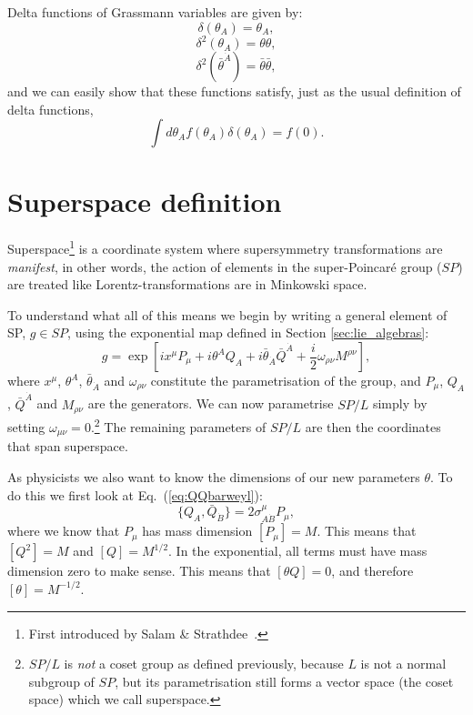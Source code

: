 \documentclass[notes.tex]{subfiles}
\begin{document}
Delta functions of Grassmann variables are given by:
\[\delta(\theta_A) = \theta_A,\]
\[\delta^2(\theta_A) = \theta\theta,\]
\[\delta^2(\bar{\theta}^{\dot{A}}) = \bar{\theta}\bar{\theta},\]
and we can easily show that these functions satisfy, just as the usual definition of delta functions,
\[\int d\theta_A f(\theta_A)\delta(\theta_A) = f(0).\]


\section[Superspace definition]{Superspace definition}
\label{sec:superspace}
Superspace\footnote{First introduced by Salam \& Strathdee~\cite{Salam:1974jj}.} is a coordinate system where supersymmetry transformations are {\it manifest}, in other words, the action of elements in the super-Poincaré group ($SP$) are treated like Lorentz-transformations are in Minkowski space.

To understand what all of this means we begin by writing a general element of SP, $g\in SP$, using the exponential map defined in Section \ref{sec:lie_algebras}:
\[g = \exp[ix^\mu P_\mu + i\theta^{A} Q_A + i\bar{\theta}_{\dot{A}}\bar{Q}^{\dot{A}} + \frac{i}{2}\omega_{\rho\nu}M^{\rho\nu}],\]
where $x^\mu$, $\theta^{A}$, $\bar{\theta}_{\dot{A}}$ and $\omega_{\rho\nu}$ constitute the parametrisation of the group, and $P_\mu$, $Q_A$, $\bar Q^{\dot{A}}$ and $M_{\rho\nu}$ are the generators. We can now parametrise $SP/L$ simply by setting $\omega_{\mu\nu} = 0$.\footnote{$SP/L$ is {\it not} a coset group as defined previously, because $L$ is not a normal subgroup of $SP$, but its parametrisation still forms a vector space (the coset space) which we call superspace.} The remaining parameters of $SP/L$ are then the coordinates that span superspace. 

As physicists we also want to know the dimensions of our new parameters $\theta$. To do this we first look at Eq.~(\ref{eq:QQbarweyl}):
\[\{Q_A, \bar{Q}_{\dot{B}}\} = 2\sigma^{\mu}_{A\dot{B}}P_\mu,\]
where we know that $P_\mu$ has mass dimension $[P_\mu] = M$. This means that $[Q^2] = M$ and $[Q]=M^{1/2}$. In the exponential, all terms must have mass dimension zero to make sense. This means that $[\theta Q] = 0$, and therefore $[\theta] = M^{-1/2}$.
\end{document}
